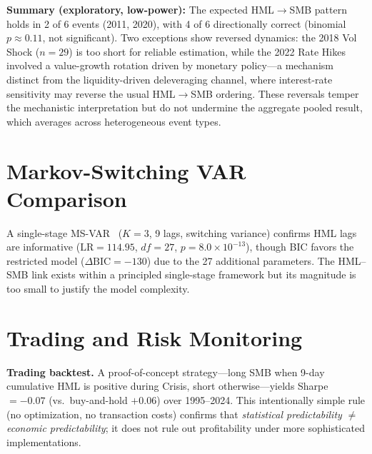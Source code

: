 \documentclass[sigconf,anonymous]{acmart}
\begin{document}
\textbf{Summary (exploratory, low-power):} The expected HML$\to$SMB pattern
holds in 2 of 6 events (2011, 2020), with 4 of 6 directionally correct
(binomial $p \approx 0.11$, not significant). Two exceptions show reversed dynamics:
the 2018 Vol Shock ($n = 29$) is too short for reliable estimation, while the
2022 Rate Hikes involved a value-growth rotation driven by monetary policy---a
mechanism distinct from the liquidity-driven deleveraging channel, where
interest-rate sensitivity may reverse the usual HML$\to$SMB ordering.
These reversals temper the mechanistic interpretation but do not undermine
the aggregate pooled result, which averages across heterogeneous event types.

\section{Markov-Switching VAR Comparison}

A single-stage MS-VAR~\cite{krolzig1997markov} ($K = 3$, 9 lags, switching variance)
confirms HML lags are informative ($\text{LR} = 114.95$, $df = 27$, $p = 8.0 \times 10^{-13}$),
though BIC favors the restricted model ($\Delta\text{BIC} = -130$) due to the 27 additional
parameters. The HML--SMB link exists within a principled single-stage framework
but its magnitude is too small to justify the model complexity.

\section{Trading and Risk Monitoring}
\label{app:trading}
\label{app:var}

\textbf{Trading backtest.}
A proof-of-concept strategy---long SMB when 9-day cumulative HML is positive
during Crisis, short otherwise---yields Sharpe $= -0.07$ (vs.\ buy-and-hold
$+0.06$) over 1995--2024. This intentionally simple rule (no optimization,
no transaction costs) confirms that \emph{statistical predictability}
$\neq$ \emph{economic predictability}; it does not rule out
profitability under more sophisticated implementations.
\end{document}
